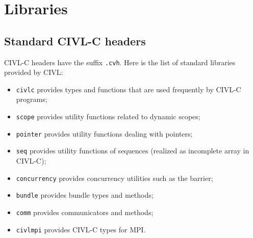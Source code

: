 






\chapter{Libraries}

\section{Standard CIVL-C headers}
CIVL-C headers have the suffix \texttt{.cvh}. Here is the list of standard libraries provided by CIVL:
\begin{itemize}
\item \texttt{civlc} provides types and functions that are used frequently by CIVL-C programs; 
\item \texttt{scope} provides utility functions related to dynamic scopes;
\item \texttt{pointer} provides utility functions dealing with pointers;
\item \texttt{seq} provides utility functions of sequences (realized as incomplete array in CIVL-C);
\item \texttt{concurrency} provides concurrency utilities such as the barrier;
\item \texttt{bundle} provides bundle types and methods;
\item \texttt{comm} provides communicators and methods;
\item \texttt{civlmpi} provides CIVL-C types for MPI.
\end{itemize}

